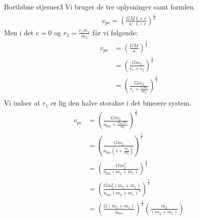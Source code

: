 \begin{opgave}{Bortløbne stjerner}{3}
\opg Vi bruger de tre oplysninger samt formlen. 
\begin{align*}
v_{pe} = \left( \frac{GM}{a} \frac{1+e}{1-e} \right) ^{\frac{1}{2}}
\end{align*}
Men i det $e=0$ og $r_2=\frac{r_1m_1}{m_2}$ får vi følgende:
\begin{align*}
v_{pe} &= \left( \frac{GM}{a} \right) ^{\frac{1}{2}}\\
&=\left( \frac{Gm_2}{r_1+r_2} \right) ^{\frac{1}{2}}\\
&=\left( \frac{Gm_2}{r_1+\frac{r_1m_1}{m_2}} \right) ^{\frac{1}{2}}\\
\end{align*}
Vi indser at $r_1$ er lig den halve storakse i det bineære system. 
\begin{align*}
v_{pe} &=\left( \frac{Gm_2}{a_{bin}+\frac{a_{bin}m_1}{m_2}} \right) ^{\frac{1}{2}}\\
&=\left( \frac{Gm_2}{a_{bin}\left( 1+ \frac{m_1}{m_2}\right) } \right) ^{\frac{1}{2}}\\
&=\left( \frac{Gm_2^2}{a_{bin}\left( m_2+ m_1\right) } \right) ^{\frac{1}{2}}\\
&= \left( \frac{Gm_2^2\left( m_2+m_1\right)}{a_{bin}\left( m_2+m_1\right)^2} \right) ^{\frac{1}{2}}\\
&= \left( \frac{G\left( m_2+m_1\right)}{a_{bin}}\right) ^{\frac{1}{2}} \left( \frac{m_2}{\left( m_2+m_1\right)} \right) 
\end{align*}
\end{opgave}


